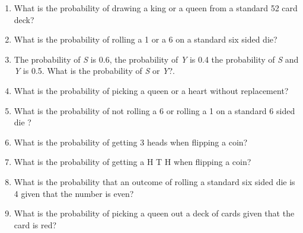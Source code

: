 \documentclass[12pt]{article}
\begin{document}
\begin{enumerate}

\item What is the probability of drawing a king or a queen from a standard 52 card deck?\\   %
\vspace{2em}

\item What is the probability of rolling a 1 or a  6 on a standard six sided die?\\   %
\vspace{2em}

\item The probability of \textit{S} is 0.6, the probability of \textit{Y} is 0.4 the probability of \textit{S} and \textit{Y} is 0.5. What is the probability of \textit{S} or \textit{Y}?. \\  
\vspace{2em}

\item What is the probability of picking a queen or a heart  without replacement?\\ %
\vspace{2em}

\item What is the probability of not rolling a 6 or rolling a 1 on a standard 6 sided die ? \\ %
\vspace{2em}

\item What is the probability of getting 3 heads when flipping a coin?\\  %
\vspace{2em}

\item What is the probability of getting a H T H when flipping a coin? \\ %
\vspace{2em}

\item What is the probability that an outcome of rolling a standard six sided die is 4 given that the number is even?\\ %
\vspace{2em}

\item What is the probability of picking a queen out a deck of cards given that the card is red?\\ %
\vspace{2em}


\end{enumerate}
\end{document}
